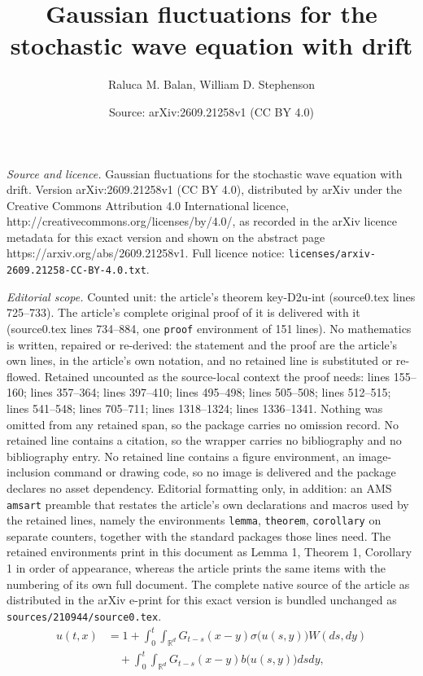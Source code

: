 \documentclass[10pt,a4paper]{amsart}
\title{Gaussian fluctuations for the stochastic wave equation with drift}
\author{Raluca M. Balan, William D. Stephenson}
\date{Source: arXiv:2609.21258v1 (CC BY 4.0)}
\def\bR{\mathbb{R}}
\begin{document}
\maketitle

\noindent\emph{Source and licence.} Gaussian fluctuations for the stochastic wave equation with drift. Version arXiv:2609.21258v1 (CC BY 4.0), distributed by arXiv under the Creative Commons Attribution 4.0 International licence, http://creativecommons.org/licenses/by/4.0/, as recorded in the arXiv licence metadata for this exact version and shown on the abstract page https://arxiv.org/abs/2609.21258v1. Full licence notice: \texttt{licenses/arxiv-2609.21258-CC-BY-4.0.txt}.\par\smallskip

\noindent\textit{Editorial scope.} Counted unit: the article's theorem key-D2u-int (source0.tex lines 725--733). The article's complete original proof of it is delivered with it (source0.tex lines 734--884, one \texttt{proof} environment of 151 lines). No mathematics is written, repaired or re-derived: the statement and the proof are the article's own lines, in the article's own notation, and no retained line is substituted or re-flowed.  Retained uncounted as the source-local context the proof needs: lines 155--160; lines 357--364; lines 397--410; lines 495--498; lines 505--508; lines 512--515; lines 541--548; lines 705--711; lines 1318--1324; lines 1336--1341.  Nothing was omitted from any retained span, so the package carries no omission record.  No retained line contains a citation, so the wrapper carries no bibliography and no bibliography entry.  No retained line contains a figure environment, an image-inclusion command or drawing code, so no image is delivered and the package declares no asset dependency.  Editorial formatting only, in addition: an AMS \texttt{amsart} preamble that restates the article's own declarations and macros used by the retained lines, namely the environments \texttt{lemma}, \texttt{theorem}, \texttt{corollary} on separate counters, together with the standard packages those lines need.  The retained environments print in this document as Lemma 1, Theorem 1, Corollary 1 in order of appearance, whereas the article prints the same items with the numbering of its own full document.  The complete native source of the article as distributed in the arXiv e-print for this exact version is bundled unchanged as \texttt{sources/210944/source0.tex}.
\begin{align}
\nonumber
u(t,x) & =1+\int_0^t \int_{\bR^d}G_{t-s}(x-y)\sigma\big(u(s,y)\big) W(ds,dy) \\
\label{mild soln}
& \quad +\int_0^t \int_{\bR^d} G_{t-s}(x-y) b\big(u(s,y)\big)dsdy,
\end{align}
\end{document}
